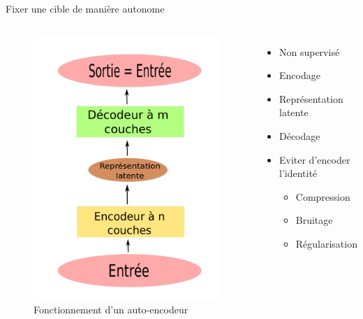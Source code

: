 \documentclass{beamer}
\begin{document}
\begin{frame}{Fixer une cible  de manière autonome}

  \begin{columns}
    \begin{figure}
      \centering
      \includegraphics[scale=0.125]{../Figures/Autoencoder}
      \caption{Fonctionnement d'un auto-encodeur}
    \end{figure}

    \begin{itemize}
    \item Non supervisé\pause
    \item Encodage\pause
    \item Représentation latente \pause
    \item Décodage \pause
    \item Eviter d'encoder l'identité\pause
      \begin{itemize}
      \item Compression\pause
      \item Bruitage\pause
      \item Régularisation
      \end{itemize}
    \end{itemize}
  \end{columns}
\end{frame}
\end{document}
